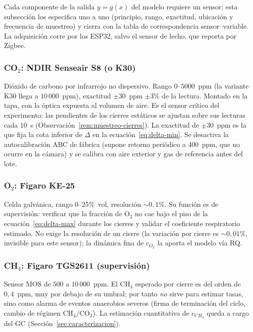 Cada componente de la salida $y = g(x)$ del modelo requiere un sensor; esta
subsección los especifica uno a uno (principio, rango, exactitud, ubicación y
frecuencia de muestreo) y cierra con la tabla de correspondencia
sensor--variable. La adquisición corre por los ESP32, salvo el sensor de
lecho, que reporta por Zigbee.

\subsubsection{CO$_2$: NDIR Senseair S8 (o K30)}

Dióxido de carbono por infrarrojo no dispersivo. Rango $0$--$5000$~ppm (la
variante K30 llega a $10\,000$~ppm), exactitud $\pm 30$~ppm $\pm 3\%$ de la
lectura. Montado en la tapa, con la óptica expuesta al volumen de aire. Es el
sensor crítico del experimento: las pendientes de los cierres estáticos se
ajustan sobre sus lecturas cada $10$~s (Observación~\ref{rem:muestreo-cierres}).
La exactitud de $\pm 30$~ppm es la que fija la cota inferior de $\Delta$ en la
ecuación~\eqref{eq:delta-min}. Se desactiva la autocalibración ABC de fábrica
(supone retorno periódico a 400~ppm, que no ocurre en la cámara) y se calibra
con aire exterior y gas de referencia antes del lote.

\subsubsection{O$_2$: Figaro KE-25}

Celda galvánica, rango $0$--$25\%$~vol, resolución $\sim 0{,}1\%$. Su función
es de supervisión: verificar que la fracción de O$_2$ no cae bajo el piso de
la ecuación~\eqref{eq:delta-max} durante los cierres y validar el coeficiente
respiratorio estimado. No exige la resolución de un cierre (la variación por
cierre es $\sim 0{,}01\%$, invisible para este sensor); la dinámica fina de
$c_{O_2}$ la aporta el modelo vía RQ.

\subsubsection{CH$_4$: Figaro TGS2611 (supervisión)}

Sensor MOS de $500$ a $10\,000$~ppm. El CH$_4$ esperado por cierre es del
orden de $0{,}4$~ppm, muy por debajo de su umbral; por tanto \emph{no} sirve
para estimar tasas, sino como alarma de eventos anaerobios severos (firma de
terminación del ciclo, cambio de régimen CH$_4$/CO$_2$). La estimación
cuantitativa de $c_{CH_4}$ queda a cargo del GC
(Sección~\ref{sec:caracterizacion}).

